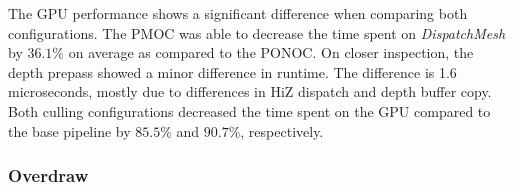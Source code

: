 \noindent
The \ac{GPU} performance shows a significant difference when comparing both configurations. The \ac{PMOC} 
was able to decrease the time spent on \emph{DispatchMesh} by $36.1\%$ on average as compared to the 
\ac{PONOC}. On closer inspection, the depth prepass showed a minor difference in runtime. The difference 
is 1.6 microseconds, mostly due to differences in \ac{HiZ} dispatch and depth buffer copy. \\

\noindent
Both culling configurations decreased the time spent on the \ac{GPU} compared to the base pipeline by 
$85.5\%$ and $90.7\%$, respectively.

\clearpage

\subsubsection*{Overdraw} \label{subsubsec-overdraw-bunny}

